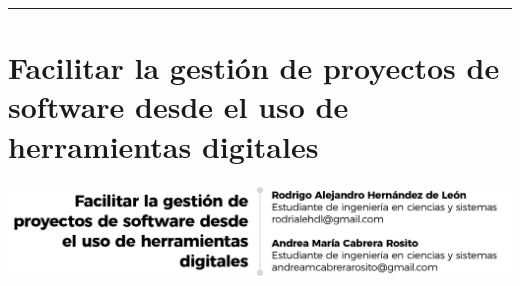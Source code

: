 \documentclass[12pt,spanish,Letterpaper,openany]{book}
\newcommand{\HRule}{\begin{center}\rule{0.5\linewidth}{0.2mm}\end{center}}
\begin{document}
\medskip

\HRule

\medskip

\hypertarget{pareja11}{%
\chapter{Facilitar la gestión de proyectos de software desde el uso de herramientas digitales}\label{pareja11}}

\begin{center}\includegraphics[width=1\linewidth]{autores/pareja11_01} \end{center}
\end{document}
